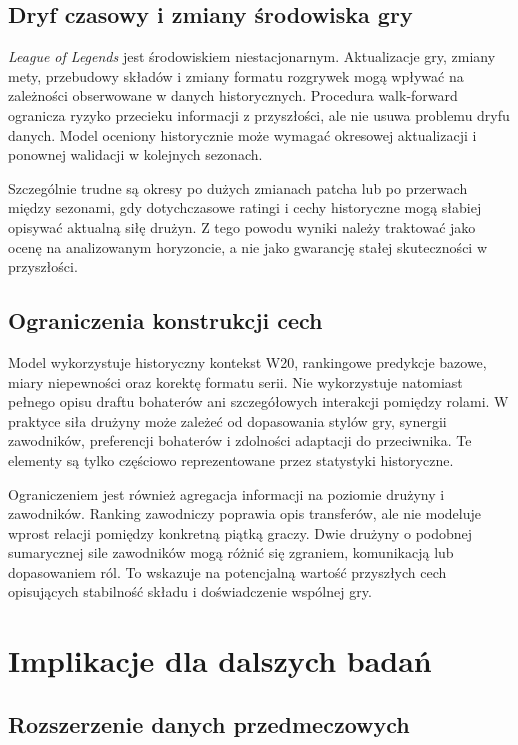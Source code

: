 \subsection{Dryf czasowy i zmiany środowiska gry}

\textit{League of Legends} jest środowiskiem niestacjonarnym. Aktualizacje gry, zmiany mety, przebudowy składów i zmiany formatu rozgrywek mogą wpływać na zależności obserwowane w danych historycznych. Procedura walk-forward ogranicza ryzyko przecieku informacji z przyszłości, ale nie usuwa problemu dryfu danych. Model oceniony historycznie może wymagać okresowej aktualizacji i ponownej walidacji w kolejnych sezonach.

Szczególnie trudne są okresy po dużych zmianach patcha lub po przerwach między sezonami, gdy dotychczasowe ratingi i cechy historyczne mogą słabiej opisywać aktualną siłę drużyn. Z tego powodu wyniki należy traktować jako ocenę na analizowanym horyzoncie, a nie jako gwarancję stałej skuteczności w przyszłości.

\subsection{Ograniczenia konstrukcji cech}

Model wykorzystuje historyczny kontekst W20, rankingowe predykcje bazowe, miary niepewności oraz korektę formatu serii. Nie wykorzystuje natomiast pełnego opisu draftu bohaterów ani szczegółowych interakcji pomiędzy rolami. W praktyce siła drużyny może zależeć od dopasowania stylów gry, synergii zawodników, preferencji bohaterów i zdolności adaptacji do przeciwnika. Te elementy są tylko częściowo reprezentowane przez statystyki historyczne.

Ograniczeniem jest również agregacja informacji na poziomie drużyny i zawodników. Ranking zawodniczy poprawia opis transferów, ale nie modeluje wprost relacji pomiędzy konkretną piątką graczy. Dwie drużyny o podobnej sumarycznej sile zawodników mogą różnić się zgraniem, komunikacją lub dopasowaniem ról. To wskazuje na potencjalną wartość przyszłych cech opisujących stabilność składu i doświadczenie wspólnej gry.

\section{Implikacje dla dalszych badań}

\subsection{Rozszerzenie danych przedmeczowych}

